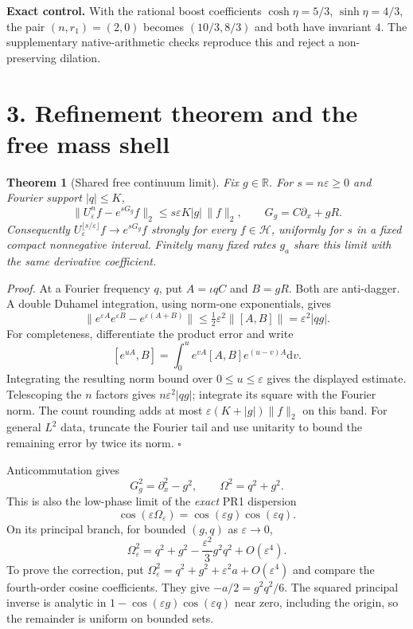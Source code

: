 \documentclass[11pt,a4paper]{article}
\newtheorem{theorem}{Theorem}\newtheorem{proposition}[theorem]{Proposition}
\newcommand{\ii}{\iota}\newcommand{\id}{\mathbf1}\newcommand{\dd}{\mathrm d}\newcommand{\tr}{\operatorname{Tr}}
\begin{document}
\textbf{Exact control.} With the rational boost coefficients $\cosh\eta=5/3$, $\sinh\eta=4/3$, the pair $(n,r_1)=(2,0)$ becomes $(10/3,8/3)$ and both have invariant $4$. The supplementary native-arithmetic checks reproduce this and reject a non-preserving dilation.

\newpage
\section*{3. Refinement theorem and the free mass shell}
\begin{theorem}[Shared free continuum limit]
Fix $g\in\mathbb R$. For $s=n\varepsilon\geq0$ and Fourier support $|q|\leq K$,
\[
\boxed{\ \|U_\varepsilon^n f-e^{sG_g}f\|_2
\leq s\varepsilon K|g|\,\|f\|_2,\qquad
G_g=C\partial_x+gR.\ }
\]
Consequently $U_\varepsilon^{\lfloor s/\varepsilon\rfloor}f\to e^{sG_g}f$ strongly for every $f\in\mathcal H$, uniformly for $s$ in a fixed compact nonnegative interval. Finitely many fixed rates $g_a$ share this limit with the same derivative coefficient.
\end{theorem}
\textit{Proof.} At a Fourier frequency $q$, put $A=\ii qC$ and $B=gR$. Both are anti-dagger. A double Duhamel integration, using norm-one exponentials, gives
\[
\|e^{\varepsilon A}e^{\varepsilon B}-e^{\varepsilon(A+B)}\|
\leq\tfrac12\varepsilon^2\|[A,B]\|
=\varepsilon^2|qg|.
\]
For completeness, differentiate the product error and write
\[
[e^{uA},B]=\int_0^u e^{vA}[A,B]e^{(u-v)A}\dd v.
\]
Integrating the resulting norm bound over $0\leq u\leq\varepsilon$ gives the displayed estimate. Telescoping the $n$ factors gives $n\varepsilon^2|qg|$; integrate its square with the Fourier norm. The count rounding adds at most $\varepsilon(K+|g|)\|f\|_2$ on this band. For general $L^2$ data, truncate the Fourier tail and use unitarity to bound the remaining error by twice its norm. $\square$

Anticommutation gives
\[
G_g^2=\partial_x^2-g^2,\qquad
\boxed{\Omega^2=q^2+g^2.}
\]
This is also the low-phase limit of the \emph{exact} PR1 dispersion
\[
\cos(\varepsilon\Omega_\varepsilon)
=\cos(\varepsilon g)\cos(\varepsilon q).
\]
On its principal branch, for bounded $(g,q)$ as $\varepsilon\to0$,
\[
\boxed{\Omega_\varepsilon^2=q^2+g^2
-\frac{\varepsilon^2}{3}g^2q^2+O(\varepsilon^4).}
\]
To prove the correction, put $\Omega_\varepsilon^2=q^2+g^2+\varepsilon^2a+O(\varepsilon^4)$ and compare the fourth-order cosine coefficients. They give $-a/2=g^2q^2/6$. The squared principal inverse is analytic in $1-\cos(\varepsilon g)\cos(\varepsilon q)$ near zero, including the origin, so the remainder is uniform on bounded sets.
\end{document}
